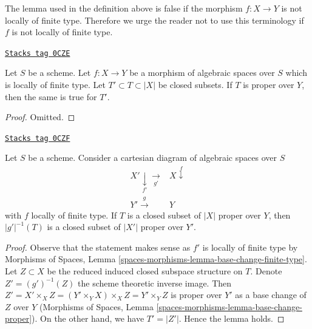 The lemma used in the definition above is false if the morphism
$f : X \to Y$ is not locally of finite type. Therefore we urge
the reader not to use this terminology if $f$ is not locally of
finite type.

\begin{lemma}
\label{spaces-perfect-lemma-closed-closed-proper-over-base}
\href{https://stacks.math.columbia.edu/tag/0CZE}{\texttt{Stacks tag 0CZE}}

Let $S$ be a scheme.
Let $f : X \to Y$ be a morphism of algebraic spaces over $S$
which is locally of finite type.
Let $T' \subset T \subset |X|$ be closed subsets.
If $T$ is proper over $Y$, then the same is true for $T'$.
\end{lemma}

\begin{proof}
Omitted.
\end{proof}

\begin{lemma}
\label{spaces-perfect-lemma-base-change-closed-proper-over-base}
\href{https://stacks.math.columbia.edu/tag/0CZF}{\texttt{Stacks tag 0CZF}}

Let $S$ be a scheme.
Consider a cartesian diagram of algebraic spaces over $S$
$$
\begin{array}{cc}X' \underset{f'}{\downarrow}\underset{g'}{\longrightarrow} & X \overset{f}{\downarrow} \\ Y' \overset{g}{\longrightarrow} & Y\end{array}
$$
with $f$ locally of finite type.
If $T$ is a closed subset of $|X|$ proper over $Y$, then
$|g'|^{-1}(T)$ is a closed subset of $|X'|$ proper over $Y'$.
\end{lemma}

\begin{proof}
Observe that the statement makes sense as $f'$ is locally of
finite type by Morphisms of Spaces, Lemma
\ref{spaces-morphisms-lemma-base-change-finite-type}.
Let $Z \subset X$ be the reduced induced closed subspace structure on $T$.
Denote $Z' = (g')^{-1}(Z)$ the scheme theoretic inverse image.
Then $Z' = X' \times_X Z = (Y' \times_Y X) \times_X Z = Y' \times_Y Z$
is proper over $Y'$ as a base change of $Z$ over $Y$
(Morphisms of Spaces, Lemma \ref{spaces-morphisms-lemma-base-change-proper}).
On the other hand, we have $T' = |Z'|$. Hence the lemma holds.
\end{proof}

